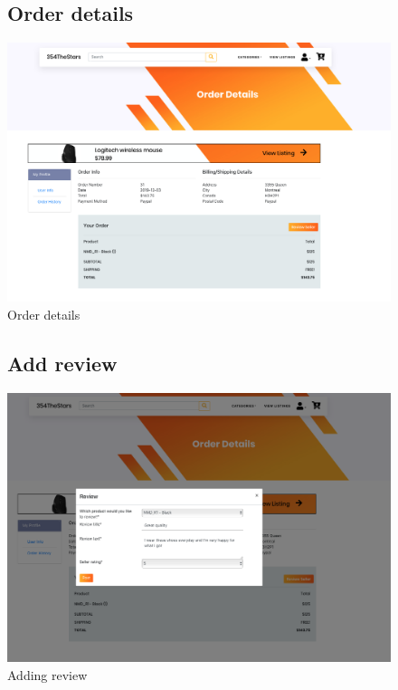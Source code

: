 \documentclass[11pt]{article}
\begin{document}
\begin{figure}[ht!]
    \subsection{Order details}
    \centering
    \includegraphics[width=\textwidth,height=0.3\paperheight,keepaspectratio]{Diagrams/External_Interfaces/Order_Details.png}
    \caption{Order details}
    \label{fig: Latest listings}
\end{figure}
\FloatBarrier

\begin{figure}[ht!]
    \subsection{Add review}
    \centering
    \includegraphics[width=\textwidth,height=0.3\paperheight,keepaspectratio]{Diagrams/External_Interfaces/Adding_Review.png}
    \caption{Adding review}
    \label{fig: Latest listings}
\end{figure}
\FloatBarrier
\end{document}
